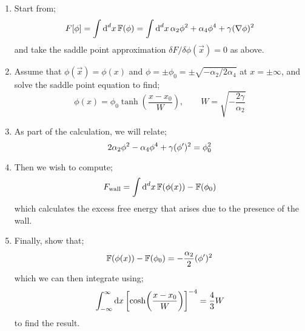 \begin{enumerate}
\item Start from;
\begin{equation*}
F[\phi] = \int{\text{d}^d x \,\mathbb{F}(\phi)} = \int{\text{d}^d x \,\alpha_2 \phi^2 + \alpha_4 \phi^4 + \gamma (\nabla \phi)^2}
\end{equation*}
and take the saddle point approximation $\delta F/\delta \phi(\vec{x}) = 0$ as above.
\item Assume that $\phi(\vec{x}) = \phi(x)$ and $\phi = \pm \phi_0 = \pm \sqrt{-\alpha_2/2\alpha_4}$ at $x = \pm \infty$, and solve the saddle point equation to find;
\begin{equation*}
\phi(x) = \phi_0 \tanh \left(\frac{x - x_0}{W}\right), \qquad W = \sqrt{-\frac{2\gamma}{\alpha_2}}
\end{equation*}
\item As part of the calculation, we will relate;
\begin{equation*}
2\alpha_2 \phi^2 - \alpha_4 \phi^4 + \gamma (\phi^{\prime})^2 = \phi_0^2
\end{equation*}
\item Then we wish to compute;
\begin{equation*}
F_{\text{wall}} = \int{\text{d}^d x \,\mathbb{F}(\phi(x)) - \mathbb{F}(\phi_0)}
\end{equation*}
which calculates the excess free energy that arises due to the presence of the wall.
\item Finally, show that;
\begin{equation*}
\mathbb{F}(\phi(x)) - \mathbb{F}(\phi_0) = -\frac{\alpha_2}{2}(\phi^{\prime})^2
\end{equation*}
which we can then integrate using;
\begin{equation*}
\int_{-\infty}^{\infty}{\upd{x}\left[\cosh\left(\frac{x - x_0}{W}\right)\right]^{-4}} = \frac{4}{3}W
\end{equation*}
to find the result.
\end{enumerate}

\newpage
